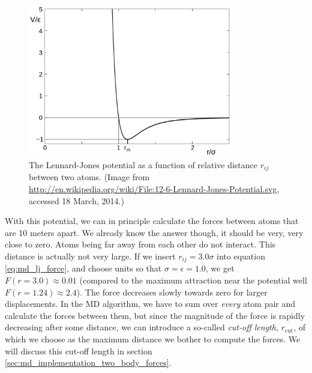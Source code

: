 \begin{figure}[h]
\begin{center}
\includegraphics[width=0.8\textwidth, trim=0cm 0cm 0cm 0cm, clip]{MD/figures/lennard_jones.png}
\end{center}
\caption{The Lennard-Jones potential as a function of relative distance $r_{ij}$ between two atoms. (Image from \url{http://en.wikipedia.org/wiki/File:12-6-Lennard-Jones-Potential.svg}, accessed 18 March, 2014.)}
\label{fig:md_lennard_jones}
\end{figure}
With this potential, we can in principle calculate the forces between atoms that are 10 meters apart. We already know the answer though, it should be very, very close to zero. Atoms being far away from each other do not interact. This distance is actually not very large. If we insert $r_{ij} = 3.0\sigma$ into equation \eqref{eq:md_lj_force}, and choose units so that $\sigma = \epsilon = 1.0$, we get $F(r=3.0) \approx 0.01$ (compared to the maximum attraction near the potential well $F(r = 1.24) \approx 2.4$). The force decreases slowly towards zero for larger displacements. In the MD algorithm, we have to sum over \textit{every} atom pair and calculate the forces between them, but since the magnitude of the force is rapidly decreasing after some distance, we can introduce a so-called \textit{cut-off length}, $r_\text{cut}$, of which we choose as the maximum distance we bother to compute the forces. We will discuss this cut-off length in section \ref{sec:md_implementation_two_body_forces}.